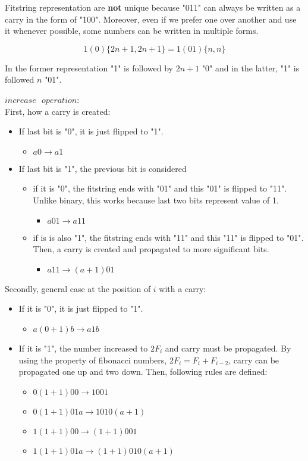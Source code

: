 Fitstring representation are \textbf{not} unique because "011" can always be written as a carry in the form of "100". Moreover, even if we prefer one over another and use it whenever possible, some numbers can be written in multiple forms.

$$
1(0)\{2n+1, 2n+1\} = 1(01)\{n, n\}
$$ 

In the former representation "1" is followed by $2n + 1$ "0" and in the latter, "1" is followed $n$ "01". 

\vspace{0.3cm}
$increase\text{ }operation$: \\
First, how a carry is created:
\begin{itemize} 
\itemsep -2pt
\item If last bit is "0", it is just flipped to "1".
\begin{itemize}
\item $a0 \rightarrow a1$
\end{itemize}
\item If last bit is "1", the previous bit is considered
\begin{itemize}
\itemsep -2pt
\item if it is "0", the fitstring ends with "01" and this "01" is flipped to "11". Unlike binary, this works because last two bits represent value of 1.
\begin{itemize}
\item $a01 \rightarrow a11$
\end{itemize}
\item if is is also "1", the fitstring ends with "11" and this "11" is flipped to "01". Then, a carry is created and propagated to more significant bits.
\begin{itemize}
\item $a11 \rightarrow (a+1)01$
\end{itemize}

\end{itemize}
\end{itemize}

Secondly, general case at the position of $i$ with a carry:
\begin{itemize}
\item If it is "0", it is just flipped to "1".
\begin{itemize}
\item $a(0+1)b \rightarrow a1b$ 
\end{itemize}
\item If it is "1", the number increased to $2F_{i}$ and carry must be propagated. By using the property of fibonacci numbers, $2F_{i} = F_{i} + F_{i-2}$, carry can be propagated one up and two down. Then, following rules are defined:
\begin{itemize}
\item $0(1+1)00  \rightarrow 1001$ 
\item $0(1+1)01a \rightarrow 1010(a+1)$ 
\item $1(1+1)00  \rightarrow (1+1)001$ 
\item $1(1+1)01a \rightarrow (1+1)010(a+1)$ 
\end{itemize}
\end{itemize}

